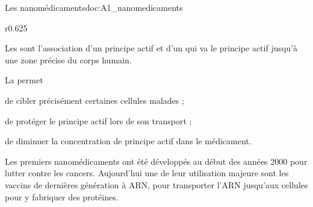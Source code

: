 \begin{doc}{Les nanomédicaments}{doc:A1_nanomedicaments}
  \begin{wrapfigure}[8]{r}{0.625\linewidth}
    \centering
    \vspace*{-10pt}
  \end{wrapfigure}

  Les  sont l'association d'un principe actif et d'un  qui va  le principe actif jusqu'à une zone précise du corps humain.

  \begin{encart}
    La  permet
    \begin{listePoints}
      \item de cibler précisément certaines cellules malades ;
      \item de protéger le principe actif lors de son transport ;
      \item de diminuer la concentration de principe actif dans le médicament.
    \end{listePoints}
  \end{encart}

  Les premiers nanomédicaments ont été développés au début des années 2000 pour lutter contre les cancers.
  Aujourd'hui une de leur utilisation majeure sont les vaccins de dernières génération à ARN, pour transporter l'ARN jusqu'aux cellules pour y fabriquer des protéines.
\end{doc}